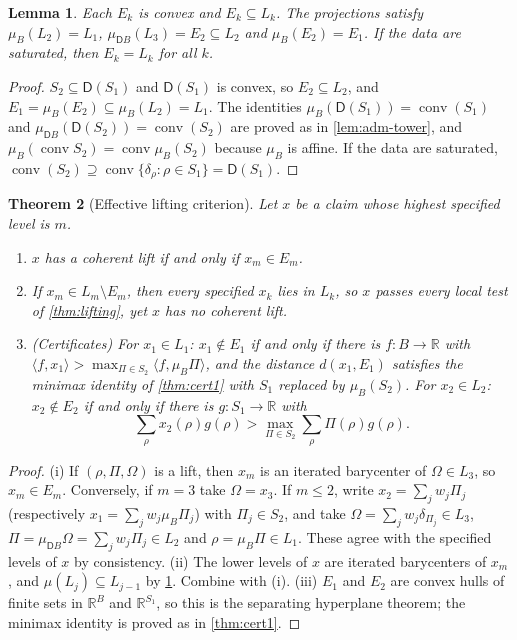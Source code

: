 \documentclass[11pt]{article}
\newtheorem{theorem}{Theorem}[section]
\newtheorem{lemma}[theorem]{Lemma}
\theoremstyle{definition}
\theoremstyle{remark}
\newcommand{\D}{\mathsf{D}}
\begin{document}
\begin{lemma}\label{lem:effective}
Each $E_k$ is convex and $E_k\subseteq L_k$. The projections satisfy $\mu_B(L_2)=L_1$,
$\mu_{\D B}(L_3)=E_2\subseteq L_2$ and $\mu_B(E_2)=E_1$. If the data are saturated, then $E_k=L_k$
for all $k$.
\end{lemma}
\begin{proof}
$S_2\subseteq\D(S_1)$ and $\D(S_1)$ is convex, so $E_2\subseteq L_2$, and $E_1=\mu_B(E_2)\subseteq
\mu_B(L_2)=L_1$. The identities $\mu_B(\D(S_1))=\operatorname{conv}(S_1)$ and
$\mu_{\D B}(\D(S_2))=\operatorname{conv}(S_2)$ are proved as in \cref{lem:adm-tower}, and
$\mu_B(\operatorname{conv}S_2)=\operatorname{conv}\mu_B(S_2)$ because $\mu_B$ is affine. If the data are
saturated, $\operatorname{conv}(S_2)\supseteq\operatorname{conv}\{\delta_\rho:\rho\in S_1\}=\D(S_1)$.
\end{proof}

\begin{theorem}[Effective lifting criterion]\label{thm:eff-lift}
Let $x$ be a claim whose highest specified level is $m$.
\begin{enumerate}[label=(\roman*)]
\item $x$ has a coherent lift if and only if $x_m\in E_m$.
\item If $x_m\in L_m\setminus E_m$, then every specified $x_k$ lies in $L_k$, so $x$ passes every
  local test of \cref{thm:lifting}, yet $x$ has no coherent lift.
\item (Certificates) For $x_1\in L_1$: $x_1\notin E_1$ if and only if there is $f\colon B\to\mathbb{R}$
  with $\langle f,x_1\rangle>\max_{\Pi\in S_2}\langle f,\mu_B\Pi\rangle$, and the distance
  $d(x_1,E_1)$ satisfies the minimax identity of \cref{thm:cert1} with $S_1$ replaced by $\mu_B(S_2)$.
  For $x_2\in L_2$: $x_2\notin E_2$ if and only if there is $g\colon S_1\to\mathbb{R}$ with
  \[
  \textstyle\sum_\rho x_2(\rho)g(\rho)>\max_{\Pi\in S_2}\sum_\rho\Pi(\rho)g(\rho).
  \]
\end{enumerate}
\end{theorem}
\begin{proof}
(i) If $(\rho,\Pi,\Omega)$ is a lift, then $x_m$ is an iterated barycenter of $\Omega\in L_3$, so
$x_m\in E_m$. Conversely, if $m=3$ take $\Omega=x_3$. If $m\le2$, write $x_2=\sum_jw_j\Pi_j$
(respectively $x_1=\sum_jw_j\mu_B\Pi_j$) with $\Pi_j\in S_2$, and take $\Omega=\sum_jw_j\delta_{\Pi_j}
\in L_3$, $\Pi=\mu_{\D B}\Omega=\sum_jw_j\Pi_j\in L_2$ and $\rho=\mu_B\Pi\in L_1$. These agree with the
specified levels of $x$ by consistency.
(ii) The lower levels of $x$ are iterated barycenters of $x_m$, and $\mu(L_j)\subseteq L_{j-1}$ by
\cref{lem:effective}. Combine with (i).
(iii) $E_1$ and $E_2$ are convex hulls of finite sets in $\mathbb{R}^B$ and $\mathbb{R}^{S_1}$, so this
is the separating hyperplane theorem; the minimax identity is proved as in \cref{thm:cert1}.
\end{proof}
\end{document}
